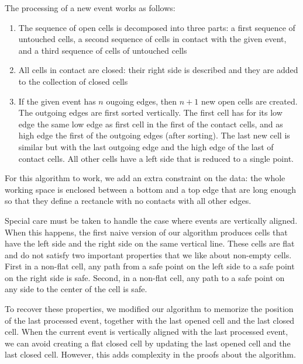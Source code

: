 \documentclass{easychair}
\begin{document}
The processing of a new event works as follows:
\begin{enumerate}
\item The sequence of open cells is decomposed into three parts:
a first sequence of untouched cells, a second sequence of cells in
contact with the given event, and a third sequence of cells of
untouched cells
\item All cells in contact are closed: their right side is
  described and they are added to the collection of closed cells
\item If the given event has \(n\) ougoing edges, then \(n+1\) new
  open cells are created.  The outgoing edges are first sorted vertically.
  The first cell has for its low edge the
  same low edge as first cell in the first of the contact cells, and
  as high edge the first of the outgoing edges (after sorting).  The
  last new cell is similar but with the last outgoing edge and the
  high edge of the last of contact cells.  All other cells have a
  left side that is reduced to a single point.
\end{enumerate}
For this algorithm to work, we add an extra constraint on the data:
the whole working space is enclosed between a bottom and a top edge
that are long enough so that they define a rectancle with no contacts
with all other edges.

Special care must be taken to handle the case where events are
vertically aligned.  When this happens, the first naive version of our
algorithm produces cells that have the left side and the right side on the
same vertical line.  These cells are flat and do not satisfy two important
properties that we like about non-empty cells.  First in a non-flat cell,
any path from a safe point on the left side to a safe point on the
right side is safe.  Second, in a non-flat cell, any path to a safe
point on any side to the center of the cell is safe.

To recover these properties, we modified our algorithm to memorize the
position of the last processed event, together with the last opened
cell and the last closed cell.  When the current event is vertically
aligned with the last processed event, we can avoid creating a flat
closed cell by updating the last opened cell and the last closed
cell.  However, this adds complexity in the proofs about the
algorithm.
\end{document}
